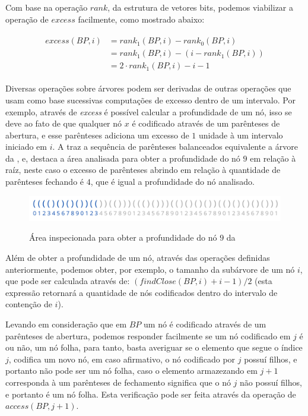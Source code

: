 Com base na operação  $rank$, da estrutura de vetores bits, podemos viabilizar a operação de $excess$ facilmente, como mostrado abaixo:

\begin{eqnarray*}
    \begin{split}
        excess(BP,i) &= rank_1(BP,i) - rank_0(BP,i) \\
        &  = rank_1(BP,i) - (i - rank_1(BP,i)) \\
        &  = 2 \cdot rank_1(BP,i) - i -1 
    \end{split}
\end{eqnarray*}

Diversas operações sobre árvores podem ser derivadas de outras operações que usam como base sucessivas computações de excesso dentro de um intervalo. Por exemplo, através de \textit{excess} é possível calcular a profundidade de um nó, isso se deve ao fato de que qualquer nó $x$ é codificado através de um parênteses de abertura, e esse parênteses adiciona um excesso de $1$ unidade à um intervalo iniciado em $i$. A  traz a sequência de parênteses balanceados equivalente a árvore da , e, destaca a área analisada para obter a profundidade do nó $9$ em relação à raíz, neste caso o excesso de parênteses abrindo em relação à quantidade de parênteses fechando é $4$, que é igual a profundidade do nó analisado.

\begin{figure}[!ht]
    \centering
      \caption[Representação de árvores com parênteses balanceados]{Área inspecionada para obter a profundidade do nó $9$ da }
      \includegraphics[width=\columnwidth]{images/excess-in-tree.png}
      \label{fig:excess-in-tree}
    \end{figure}

Além de obter a profundidade de um nó, através das operações definidas anteriormente, podemos obter, por exemplo, o tamanho da subárvore de um nó $i$, que pode ser calculada através de: $(findClose(BP,i)+i-1)/2$ (esta expressão retornará a quantidade de nós codificados dentro do intervalo de contenção de $i$). 

Levando em consideração que em $BP$ um nó é codificado através de um parênteses de abertura, podemos responder facilmente se um nó codificado em $j$ é ou não, um nó folha, para tanto, basta averiguar se o elemento que segue o índice $j$, codifica um novo nó, em caso afirmativo, o nó codificado por $j$ possuí filhos, e portanto não pode ser um nó folha, caso o elemento armazezando em $j+1$ corresponda à um parênteses de fechamento significa que o nó $j$ não possuí filhos, e portanto é um nó folha. Esta verificação pode ser feita através da operação de $access(BP,j+1)$.

